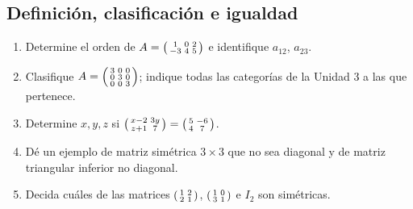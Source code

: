 \documentclass[12pt]{article}
\theoremstyle{remark}
\newcounter{contadorEjercicio}
\newenvironment{listaejercicios}{\begin{enumerate}[label=\textbf{E\arabic*.},leftmargin=2.4em,itemsep=0.52em]\setcounter{enumi}{\value{contadorEjercicio}}}{\setcounter{contadorEjercicio}{\value{enumi}}\end{enumerate}}
\begin{document}
\subsection{Definición, clasificación e igualdad}
\begin{listaejercicios}
\item Determine el orden de $A=\begin{psmallmatrix}1&0&2\\-3&4&5\end{psmallmatrix}$ e identifique $a_{12}$, $a_{23}$.
\item Clasifique $A=\begin{psmallmatrix}3&0&0\\0&3&0\\0&0&3\end{psmallmatrix}$; indique todas las categorías de la Unidad 3 a las que pertenece.
\item Determine $x,y,z$ si $\begin{psmallmatrix}x-2&3y\\z+1&7\end{psmallmatrix}=\begin{psmallmatrix}5&-6\\4&7\end{psmallmatrix}$.
\item Dé un ejemplo de matriz simétrica $3\times3$ que no sea diagonal y de matriz triangular inferior no diagonal.
\item Decida cuáles de las matrices $\begin{psmallmatrix}1&2\\2&1\end{psmallmatrix}$, $\begin{psmallmatrix}1&0\\3&1\end{psmallmatrix}$ e $I_2$ son simétricas.
\end{listaejercicios}
\end{document}
